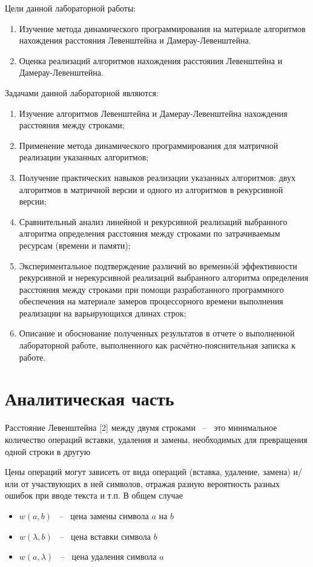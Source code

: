 \documentclass[12pt]{report}
\begin{document}
Цели данной лабораторной работы: 
\begin{enumerate}
	\item Изучение метода динамического программирования на материале алгоритмов нахождения расстояния Левенштейна и Дамерау-Левенштейна.
	\item Оценка реализаций алгоритмов нахождения расстояния Левенштейна и Дамерау-Левенштейна.
\end{enumerate}

Задачами данной лабораторной являются:
\begin{enumerate}
	\item Изучение алгоритмов Левенштейна и Дамерау-Левенштейна нахождения расстояния между строками;
	\item Применение метода динамического программирования для матричной реализации указанных алгоритмов; 
	\item Получение практических навыков реализации указанных алгоритмов: двух алгоритмов в матричной версии и одного из алгоритмов в рекурсивной версии; 
	\item Сравнительный анализ линейной и рекурсивной реализаций выбранного алгоритма определения расстояния между строками по затрачиваемым ресурсам (времени и памяти); 
	\item Экспериментальное подтверждение различий во временнóй эффективности рекурсивной и
	      нерекурсивной реализаций выбранного алгоритма определения расстояния между строками при
	      помощи разработанного программного обеспечения на материале замеров процессорного времени
	      выполнения реализации на варьирующихся длинах строк; 
	\item Описание и обоснование полученных результатов в отчете о выполненной лабораторной
	      работе, выполненного как расчётно-пояснительная записка к работе. 
\end{enumerate}

\chapter{Аналитическая часть}
Расстояние Левенштейна [2] между двумя строками ~--~ это минимальное количество операций вставки, удаления и замены, необходимых для превращения одной строки в другую

Цены операций могут зависеть от вида операций (вставка, удаление, замена) и/или от участвующих в ней символов, отражая разную вероятность разных ошибок при вводе текста и т.п. В общем случае

\begin{itemize}
	\item $w(a, b)$ ~--~ цена замены символа $a$ на $b$
	\item $w(\lambda, b)$ ~--~ цена вставки символа $b$
	\item $w(a, \lambda)$ ~--~ цена удаления символа $a$
\end{itemize}
\end{document}

